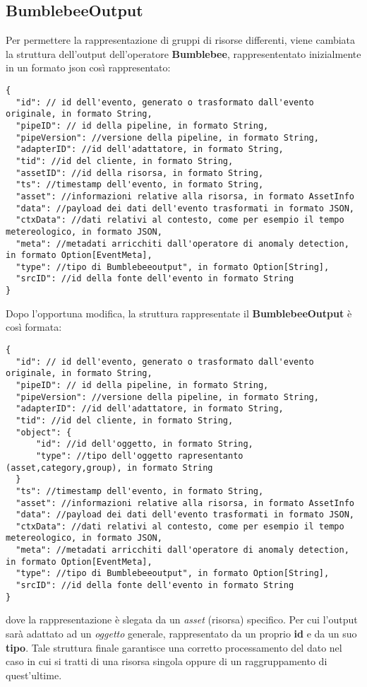 \subsection{BumblebeeOutput}\label{sec:bbout}
Per permettere la rappresentazione di gruppi di risorse differenti, viene cambiata la struttura dell'output dell'operatore \textbf{Bumblebee}, rappresententato inizialmente in un formato \gls{json} così rappresentato:

\begin{verbatim}
{
  "id": // id dell'evento, generato o trasformato dall'evento originale, in formato String,
  "pipeID": // id della pipeline, in formato String,
  "pipeVersion": //versione della pipeline, in formato String,
  "adapterID": //id dell'adattatore, in formato String,
  "tid": //id del cliente, in formato String,
  "assetID": //id della risorsa, in formato String,
  "ts": //timestamp dell'evento, in formato String,
  "asset": //informazioni relative alla risorsa, in formato AssetInfo
  "data": //payload dei dati dell'evento trasformati in formato JSON,
  "ctxData": //dati relativi al contesto, come per esempio il tempo metereologico, in formato JSON,
  "meta": //metadati arricchiti dall'operatore di anomaly detection, in formato Option[EventMeta],
  "type": //tipo di Bumblebeeoutput", in formato Option[String],
  "srcID": //id della fonte dell'evento in formato String
}
\end{verbatim}

Dopo l'opportuna modifica, la struttura rappresentate il \textbf{BumblebeeOutput} è così formata:

\begin{verbatim}
{
  "id": // id dell'evento, generato o trasformato dall'evento originale, in formato String,
  "pipeID": // id della pipeline, in formato String,
  "pipeVersion": //versione della pipeline, in formato String,
  "adapterID": //id dell'adattatore, in formato String,
  "tid": //id del cliente, in formato String,
  "object": {
	  "id": //id dell'oggetto, in formato String,
	  "type": //tipo dell'oggetto rapresentanto (asset,category,group), in formato String
  }
  "ts": //timestamp dell'evento, in formato String,
  "asset": //informazioni relative alla risorsa, in formato AssetInfo
  "data": //payload dei dati dell'evento trasformati in formato JSON,
  "ctxData": //dati relativi al contesto, come per esempio il tempo metereologico, in formato JSON,
  "meta": //metadati arricchiti dall'operatore di anomaly detection, in formato Option[EventMeta],
  "type": //tipo di Bumblebeeoutput", in formato Option[String],
  "srcID": //id della fonte dell'evento in formato String
}
\end{verbatim}
dove la rappresentazione è slegata da un \textit{asset} (risorsa) specifico. Per cui l'output sarà adattato ad un \textit{oggetto} generale, rappresentato da un proprio \textbf{id} e da un suo \textbf{tipo}.
Tale struttura finale garantisce una corretto processamento del dato nel caso in cui si tratti di una risorsa singola oppure di un raggruppamento di quest'ultime.
